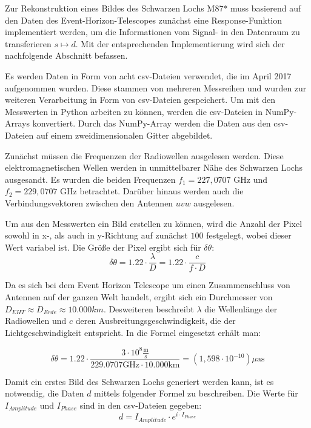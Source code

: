 \documentclass[]{dsadokumentation}
\begin{document}
Zur Rekonstruktion eines Bildes des Schwarzen Lochs M87* muss basierend auf den Daten des Event-Horizon-Telescopes zunächst eine Response-Funktion implementiert werden, um die Informationen vom Signal- in den Datenraum zu transferieren $s \mapsto d$. Mit der entsprechenden Implementierung wird sich der nachfolgende Abschnitt befassen.

Es werden Daten in Form von acht csv-Dateien verwendet, die im April 2017 aufgenommen wurden. Diese stammen von mehreren Messreihen und wurden zur weiteren Verarbeitung in Form von csv-Dateien gespeichert.
Um mit den Messwerten in Python arbeiten zu können, werden die csv-Dateien in NumPy-Arrays konvertiert. Durch das NumPy-Array werden die Daten aus den csv-Dateien auf einem zweidimensionalen Gitter abgebildet.

Zunächst müssen die Frequenzen der Radiowellen ausgelesen werden. Diese elektromagnetischen Wellen werden in unmittelbarer Nähe des Schwarzen Lochs ausgesandt. Es wurden die beiden Frequenzen $f_1 = 227,0707$ GHz und $f_2 = 229,0707$ GHz betrachtet. Darüber hinaus werden auch die Verbindungsvektoren zwischen den Antennen $uvw$ ausgelesen.

Um aus den Messwerten ein Bild erstellen zu können, wird die Anzahl der Pixel sowohl in x-, als auch in y-Richtung auf zunächst $100$ festgelegt, wobei dieser Wert variabel ist. Die Größe der Pixel ergibt sich für $\delta \theta$:
\[ \delta \theta = 1.22 \cdot \displaystyle\frac{\lambda}{D} = 1.22 \cdot \displaystyle\frac{c}{f \cdot D} \]

Da es sich bei dem Event Horizon Telescope um einen Zusammenschluss von Antennen auf der ganzen Welt handelt, ergibt sich ein Durchmesser von $D_{EHT} \approx D_{Erde} \approx 10.000km$. Desweiteren beschreibt $\lambda$ die Wellenlänge der Radiowellen und $c$ deren Ausbreitungsgeschwindigkeit, die der Lichtgeschwindigkeit entspricht. In die Formel eingesetzt erhält man:

\begin{equation}
  \delta \theta = 1.22 \cdot \displaystyle\frac{3 \cdot 10^{8} \displaystyle\frac{\text{m}}{\text{s}}} {229.0707 \text{GHz} \cdot 10.000 \text{km}} = (1,598 \cdot 10^{-10}) \mu \text{as} 
\end{equation}

Damit ein erstes Bild des Schwarzen Lochs generiert werden kann, ist es notwendig, die Daten $d$ mittels folgender Formel zu beschreiben. Die Werte für $I_{Amplitude}$ und $I_{Phase}$ sind in den csv-Dateien gegeben:
\[ d = I_{Amplitude} \cdot e^{i \cdot I_{Phase}} \]
\end{document}
